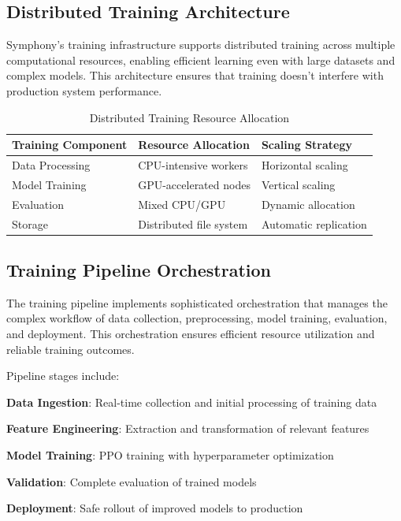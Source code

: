 \subsection*{Distributed Training Architecture}

Symphony's training infrastructure supports distributed training across multiple computational resources, enabling efficient learning even with large datasets and complex models. This architecture ensures that training doesn't interfere with production system performance.

\begin{table}[ht]
\centering
\begin{tabular}{@{}lll@{}}
\toprule
\textbf{Training Component} & \textbf{Resource Allocation} & \textbf{Scaling Strategy} \\
\midrule
Data Processing & CPU-intensive workers & Horizontal scaling \\
Model Training & GPU-accelerated nodes & Vertical scaling \\
Evaluation & Mixed CPU/GPU & Dynamic allocation \\
Storage & Distributed file system & Automatic replication \\
\bottomrule
\end{tabular}
\caption{Distributed Training Resource Allocation}
\end{table}

\subsection*{Training Pipeline Orchestration}

The training pipeline implements sophisticated orchestration that manages the complex workflow of data collection, preprocessing, model training, evaluation, and deployment. This orchestration ensures efficient resource utilization and reliable training outcomes.

Pipeline stages include:

\begin{compactlist}
    \item \textbf{Data Ingestion}: Real-time collection and initial processing of training data
    \item \textbf{Feature Engineering}: Extraction and transformation of relevant features
    \item \textbf{Model Training}: PPO training with hyperparameter optimization
    \item \textbf{Validation}: Complete evaluation of trained models
    \item \textbf{Deployment}: Safe rollout of improved models to production
\end{compactlist}

